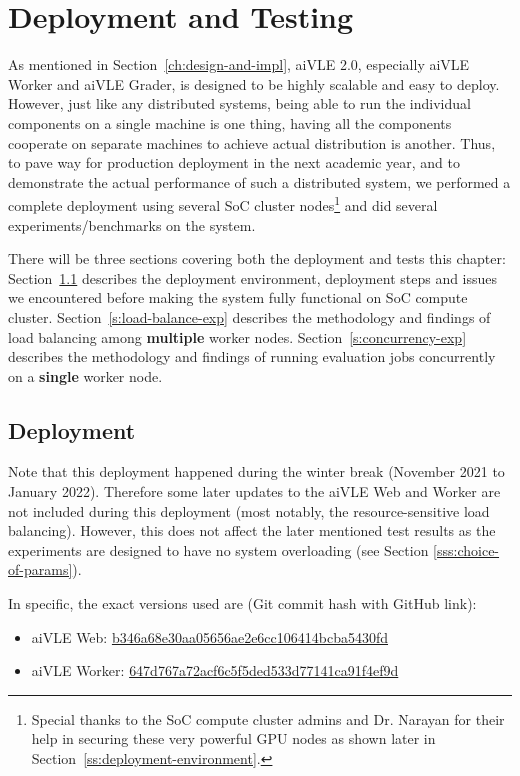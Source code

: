 \chapter{Deployment and Testing}
\label{ch:deployment-and-testing}
As mentioned in Section~\ref{ch:design-and-impl}, aiVLE 2.0, especially aiVLE Worker and aiVLE Grader, is designed to be highly scalable and easy to deploy. However, just like any distributed systems, being able to run the individual components on a single machine is one thing, having all the components cooperate on separate machines to achieve actual distribution is another. Thus, to pave way for production deployment in the next academic year, and to demonstrate the actual performance of such a distributed system, we performed a complete deployment using several SoC cluster nodes\footnote{Special thanks to the SoC compute cluster admins and Dr. Narayan for their help in securing these very powerful GPU nodes as shown later in Section~\ref{ss:deployment-environment}.} and did several experiments/benchmarks on the system.

There will be three sections covering both the deployment and tests this chapter: Section~\ref{s:deployment} describes the deployment environment, deployment steps and issues we encountered before making the system fully functional on SoC compute cluster. Section~\ref{s:load-balance-exp} describes the methodology and findings of load balancing among \textbf{multiple} worker nodes. Section~\ref{s:concurrency-exp} describes the methodology and findings of running evaluation jobs concurrently on a \textbf{single} worker node.

\section{Deployment}
\label{s:deployment}
Note that this deployment happened during the winter break (November 2021 to January 2022). Therefore some later updates to the aiVLE Web and Worker are not included during this deployment (most notably, the resource-sensitive load balancing). However, this does not affect the later mentioned test results as the experiments are designed to have no system overloading (see Section \ref{sss:choice-of-params}).

In specific, the exact versions used are (Git commit hash with GitHub link):
\begin{itemize}
    \item aiVLE Web: \href{https://github.com/edu-ai/aivle-web/commit/b346a68e30aa05656ae2e6cc106414bcba5430fd}{b346a68e30aa05656ae2e6cc106414bcba5430fd}
    \item aiVLE Worker: \href{https://github.com/edu-ai/aivle-worker/commit/647d767a72acf6c5f5ded533d77141ca91f4ef9d}{647d767a72acf6c5f5ded533d77141ca91f4ef9d}
\end{itemize}

